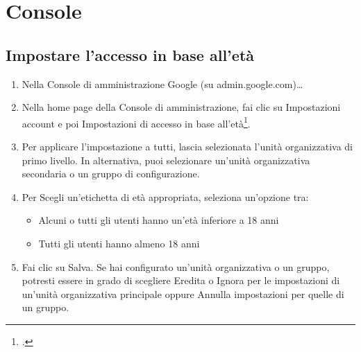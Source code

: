 
\chapter{Console}
\section{Impostare l'accesso in base all'età}
\begin{enumerate}
\item 	Nella Console di amministrazione Google (su admin.google.com)…
\item 	Nella home page della Console di amministrazione, fai clic su Impostazioni account e poi Impostazioni di accesso in base all'età\footcite{Google2023c}.
\item 	Per applicare l'impostazione a tutti, lascia selezionata l'unità organizzativa di primo livello. In alternativa, puoi selezionare un'unità organizzativa secondaria o un gruppo di configurazione.
\item 	Per Scegli un'etichetta di età appropriata, seleziona un'opzione tra:
\begin{itemize}
	\item Alcuni o tutti gli utenti hanno un'età inferiore a 18 anni
	\item Tutti gli utenti hanno almeno 18 anni
\end{itemize}
\item 	Fai clic su Salva. Se hai configurato un'unità organizzativa o un gruppo, potresti essere in grado di scegliere Eredita o Ignora per le impostazioni di un'unità organizzativa principale oppure Annulla impostazioni per quelle di un gruppo.
\end{enumerate}

